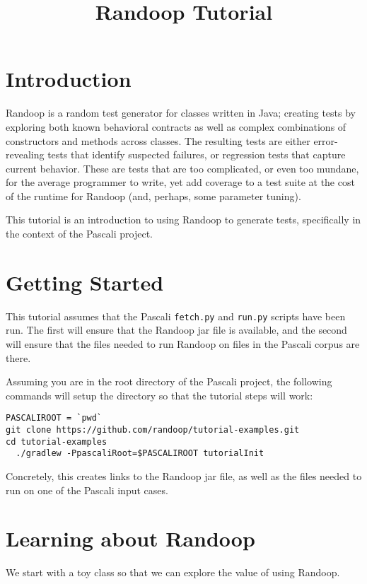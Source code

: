 \documentclass[11pt, oneside]{article} %
\title{Randoop Tutorial}
\newcommand{\cmd}[1]{{\texttt{#1}}}
\begin{document}
\maketitle

\section{Introduction}
Randoop is a random test generator for classes written in Java; 
creating tests by exploring both known behavioral contracts as well as complex combinations of constructors and methods across classes.
The resulting tests are either error-revealing tests that identify suspected failures, or regression tests that capture current behavior.
These are tests that are too complicated, or even too mundane, for the average programmer to write, yet add coverage to a test suite at the cost of the runtime for Randoop (and, perhaps, some parameter tuning).

This tutorial is an introduction to using Randoop to generate tests, specifically in the context of the Pascali project.

\section{Getting Started}
This tutorial assumes that the Pascali \cmd{fetch.py} and \cmd{run.py} scripts have been run.
The first will ensure that the Randoop jar file is available, and the second will ensure that the files needed to run Randoop on files in the Pascali corpus are there.

Assuming you are in the root directory of the Pascali project, the following commands will setup the directory so that the tutorial steps will work:
\begin{verbatim}
PASCALIROOT = `pwd`
git clone https://github.com/randoop/tutorial-examples.git
cd tutorial-examples
  ./gradlew -PpascaliRoot=$PASCALIROOT tutorialInit 
\end{verbatim}
Concretely, this creates links to the Randoop jar file, as well as the files needed to run on one of the Pascali input cases.

\section{Learning about Randoop}\label{thebasics}
We start with a toy class so that we can explore the value of using Randoop.
\end{document}
